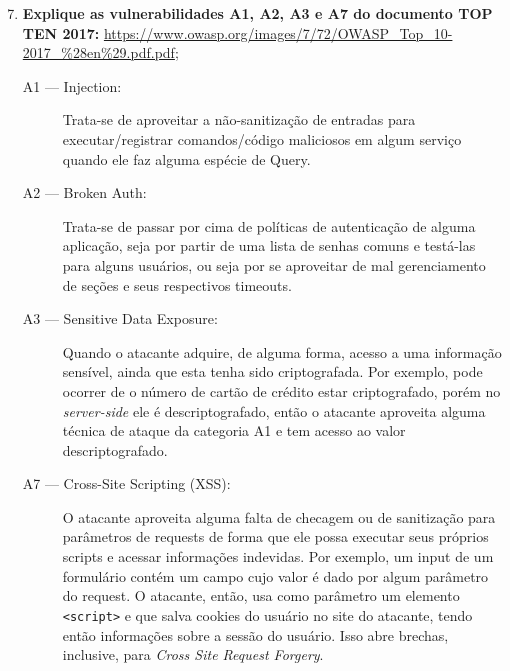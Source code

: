 \documentclass{article}
\newcommand{\code}[1]{\texttt{#1}}
\begin{document}
    \begin{enumerate}
        \setcounter{enumi}{6}
        \item \textbf{Explique as vulnerabilidades A1, A2, A3 e A7 do documento
            TOP TEN 2017:}
                \url{https://www.owasp.org/images/7/72/OWASP_Top_10-2017_%28en%29.pdf.pdf};

            \begin{description}
                \item[A1 --- Injection:] Trata-se de aproveitar a
                    não-sanitização de entradas para executar/registrar
                    comandos/código maliciosos em algum serviço quando ele faz
                    alguma espécie de Query.
                \item[A2 --- Broken Auth:] Trata-se de passar por cima de
                    políticas de autenticação de alguma aplicação, seja por
                    partir de uma lista de senhas comuns e testá-las para
                    alguns usuários, ou seja por se aproveitar de mal
                    gerenciamento de seções e seus respectivos timeouts.
                \item [A3 --- Sensitive Data Exposure:] Quando o atacante
                    adquire, de alguma forma, acesso a uma informação sensível,
                    ainda que esta tenha sido criptografada. Por exemplo, pode
                    ocorrer de o número de cartão de crédito estar
                    criptografado, porém no \textit{server-side} ele é
                    descriptografado, então o atacante aproveita alguma técnica
                    de ataque da categoria A1 e tem acesso ao valor
                    descriptografado.
                \item [A7 --- Cross-Site Scripting (XSS):] O atacante aproveita
                    alguma falta de checagem ou de sanitização para parâmetros
                    de requests de forma que ele possa executar seus próprios
                    scripts e acessar informações indevidas. Por exemplo, um
                    input de um formulário contém um campo cujo valor é dado
                    por algum parâmetro do request. O atacante, então, usa como
                    parâmetro um elemento \code{<script>} e que salva cookies
                    do usuário no site do atacante, tendo então informações
                    sobre a sessão do usuário. Isso abre brechas, inclusive,
                    para \textit{Cross Site Request Forgery}.
            \end{description}


\end{enumerate}
\end{document}
